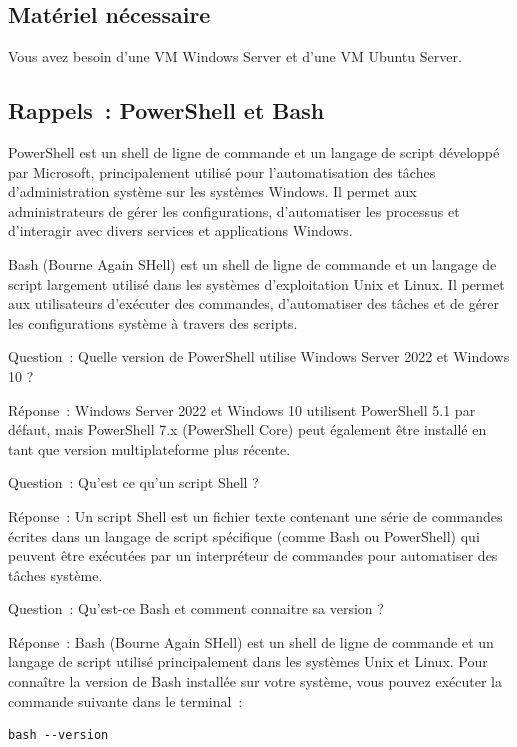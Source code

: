 \subsection*{Matériel nécessaire}
{}
\noindent Vous avez besoin d'une VM Windows Server et d'une VM Ubuntu Server.

\subsection*{Rappels~: PowerShell et Bash}
{}
\noindent PowerShell est un shell de ligne de commande et un langage de script développé par Microsoft, principalement utilisé pour l'automatisation des tâches d'administration système sur les systèmes Windows. Il permet aux administrateurs de gérer les configurations, d'automatiser les processus et d'interagir avec divers services et applications Windows.

\noindent Bash (Bourne Again SHell) est un shell de ligne de commande et un langage de script largement utilisé dans les systèmes d'exploitation Unix et Linux. Il permet aux utilisateurs d'exécuter des commandes, d'automatiser des tâches et de gérer les configurations système à travers des scripts.

\newpage

Question~: Quelle version de PowerShell utilise Windows Server 2022 et Windows 10 ?

\noindent Réponse~: Windows Server 2022 et Windows 10 utilisent PowerShell 5.1 par défaut, mais PowerShell 7.x (PowerShell Core) peut également être installé en tant que version multiplateforme plus récente.

\vspace{0.5cm}

Question~: Qu'est ce qu'un script Shell ?

\noindent Réponse~: Un script Shell est un fichier texte contenant une série de commandes écrites dans un langage de script spécifique (comme Bash ou PowerShell) qui peuvent être exécutées par un interpréteur de commandes pour automatiser des tâches système.

\vspace{0.5cm}

Question~: Qu'est-ce Bash et comment connaitre sa version ?

\noindent Réponse~: Bash (Bourne Again SHell) est un shell de ligne de commande et un langage de script utilisé principalement dans les systèmes Unix et Linux. Pour connaître la version de Bash installée sur votre système, vous pouvez exécuter la commande suivante dans le terminal~:
\begin{verbatim}
bash --version
\end{verbatim}

